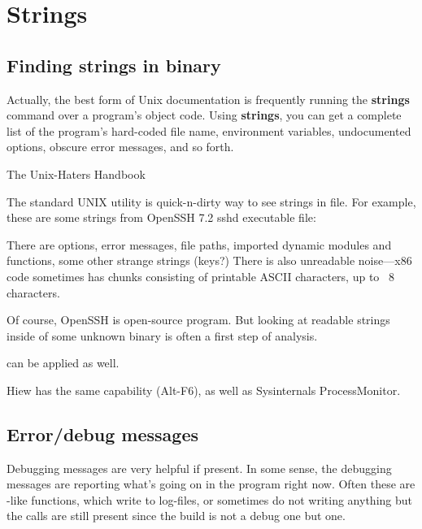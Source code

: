 \section{Strings}
\label{sec:digging_strings}



\subsection{Finding strings in binary}

\epigraph{Actually, the best form of Unix documentation is frequently running the
\textbf{strings} command over a program’s object code. Using \textbf{strings}, you can get
a complete list of the program’s hard-coded file name, environment variables,
undocumented options, obscure error messages, and so forth.}{The Unix-Haters Handbook}

The standard UNIX  utility is quick-n-dirty way to see strings in file.
For example, these are some strings from OpenSSH 7.2 sshd executable file:



There are options, error messages, file paths, imported dynamic modules and functions, some other strange strings (keys?)
There is also unreadable noise---x86 code sometimes has chunks consisting of printable ASCII characters, up to ~8 characters.

Of course, OpenSSH is open-source program.
But looking at readable strings inside of some unknown binary is often a first step of analysis.

 can be applied as well.

Hiew has the same capability (Alt-F6), as well as Sysinternals ProcessMonitor.

\subsection{Error/debug messages}

Debugging messages are very helpful if present.
In some sense, the debugging messages are reporting
what's going on in the program right now. Often these are \printf-like functions,
which write to log-files, or sometimes do not writing anything but the calls are still present 
since the build is not a debug one but  one.
\myindex{\oracle}

